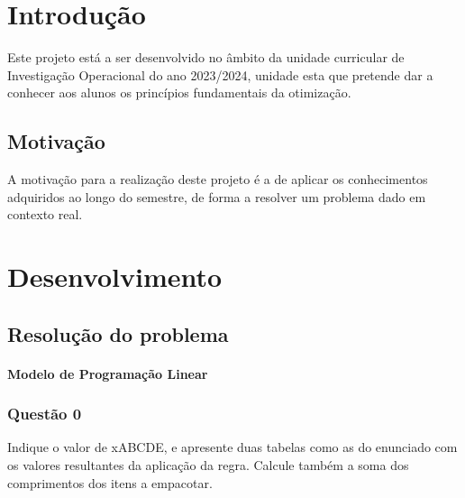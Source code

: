 \documentclass[12pt,a4paper]{report}
\begin{document}
\titleformat{\chapter}[display]   
{\normalfont\huge\bfseries}{\vspace{-50pt}}{20pt}{\Huge}
\titlespacing*{\chapter}{0pt}{0pt}{40pt}

\makecover

\tableofcontents

\newpage
    \chapter{Introdução}
    Este projeto está a ser desenvolvido no âmbito da unidade curricular de Investigação Operacional do ano 2023/2024, unidade esta que pretende dar a conhecer aos alunos os princípios fundamentais da otimização.

    \section{Motivação}
    A motivação para a realização deste projeto é a de aplicar os conhecimentos adquiridos ao longo do semestre, de forma a resolver um problema dado em contexto real.

\newpage
    \chapter{Desenvolvimento} 

    \section{Resolução do problema}
    \subsubsection{Modelo de Programação Linear}

    \subsection{Questão 0}
    Indique o valor de xABCDE, e apresente duas tabelas como as do enunciado com os valores
    resultantes da aplicação da regra. Calcule também a soma dos comprimentos dos itens a empacotar.
\end{document}
